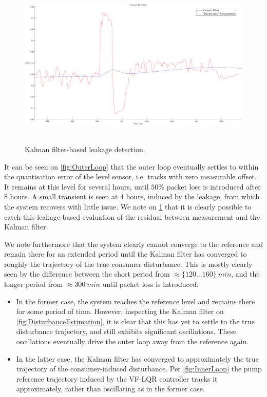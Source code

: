 \begin{figure}[h!]
	\includegraphics[height=8cm,width=\linewidth]{Pictures/LeakageDetection.pdf}
	\caption{Kalman filter-based leakage detection.}
	\label{fig:Leakage}
\end{figure}

It can be seen on \cref{fig:OuterLoop} that the outer loop eventually settles to within the quantisation error of the level sensor, i.e. tracks with zero measurable offset. It remains at this level for several hours, until $50\%$ packet loss is introduced after $8$ hours. A small transient is seen at $4$ hours, induced by the leakage, from which the system recovers with little issue. We note on \cref{fig:Leakage} that it is clearly possible to catch this leakage based evaluation of the residual between measurement and the Kalman filter. 

We note furthermore that the system clearly cannot converge to the reference and remain there for an extended period until the Kalman filter has converged to roughly the trajectory of the true consumer disturbance. This is mostly clearly seen by the difference between the short period from $\approx \{120 \ldots 160 \} \ \si{min}$, and the longer period from $\approx 300 \ \si{min}$ until packet loss is introduced: 

\clearpage

\begin{itemize}
	\item In the former case, the system reaches the reference level and remains there for some period of time. However, inspecting the Kalman filter on \cref{fig:DisturbanceEstimation}, it is clear that this has yet to settle to the true disturbance trajectory, and still exhibits significant oscillations. These oscillations eventually drive the outer loop away from the reference again.
	\item In the latter case, the Kalman filter has converged to approximately the true trajectory of the consumer-induced disturbance. Per \cref{fig:InnerLoop} the pump reference trajectory induced by the VF-LQR controller tracks it approximately, rather than oscillating as in the former case.
\end{itemize}  

